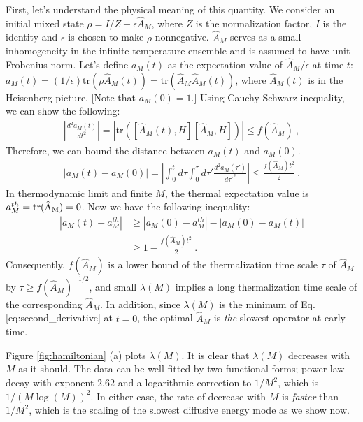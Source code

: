 \documentclass[twocolumn,superscriptaddress, prl,showpacs]{revtex4-1}
\begin{document}
First, let's understand the physical meaning of this quantity.
We consider an initial mixed state $\rho = I/Z + \epsilon \hat{A}_M$, %
where $Z$ is the normalization factor, $I$ is the identity and $\epsilon$ is chosen to make $\rho$ nonnegative.
$\hat{A}_M$ serves as a small inhomogeneity in the infinite temperature ensemble and
is assumed to have unit Frobenius norm.
Let's define $a_M(t)$ as the expectation value of $\hat{A}_M/\epsilon$ at time $t$:
$a_M(t) = (1/\epsilon)\mathrm{tr}(\rho \hat{A}_M(t)) = \mathrm{tr}(\hat{A}_M \hat{A}_M(t))$,
where $\hat{A}_M(t)$ is in the Heisenberg picture. [Note that $a_M(0) = 1$.]
Using Cauchy-Schwarz inequality, we can show the following:
\begin{align}
\left|\frac{d^2 a_M(t)}{dt^2}\right| = |\mathrm{tr}([\hat{A}_M(t),H][\hat{A}_M,H])| \leq f(\hat{A}_M) ~,
\label{eq:second_derivative}
\end{align}
Therefore, we can bound the distance between $a_M(t)$ and $a_M(0)$.
\begin{align}
|a_M(t) - a_M(0)| = \left|\int^t_0 d\tau \int^\tau_0 d\tau' \frac{d^2 a_M(\tau')}{d\tau'^2}\right| \leq \frac{f(\hat{A}_M) t^2}{2} ~.
\end{align}
In thermodynamic limit and finite $M$, the thermal expectation value is
$a_M^{th} = \rm{tr}(\hat{A}_M) = 0$.
Now we have the following inequality:
\begin{align}
|a_M(t) - a_M^{th}| &\geq |a_M(0) - a_M^{th}| - |a_M(0) - a_M(t)|  \nonumber\\
& \geq 1 - \frac{f(\hat{A}_M)t^2}{2} ~.
\label{eq:hamiltonian_timescale}
\end{align}
Consequently, $f(\hat{A}_M)$ is a lower bound of the thermalization time scale $\tau$ of $\hat{A}_M$ by $\tau \geq f(\hat{A}_M)^{-1/2}$,
and small $\lambda(M)$ implies a long thermalization time scale of the corresponding $\hat{A}_M$.
In addition, since $\lambda(M)$ is the minimum of Eq. \eqref{eq:second_derivative} at $t =0$,
the optimal $\hat{A}_M$ is {\it the} slowest operator at early time.


Figure \ref{fig:hamiltonian} (a) plots $\lambda (M)$.
It is clear that $\lambda(M)$ decreases with $M$ as it should.
The data can be well-fitted by two functional forms; power-law decay with exponent $2.62$ and a logarithmic correction to $1/M^2$, which is $1/(M\log(M))^2$.
In either case, the rate of decrease with $M$ is {\it faster} than $1/M^2$, which is the scaling of the slowest diffusive energy mode as we show now.
\end{document}
